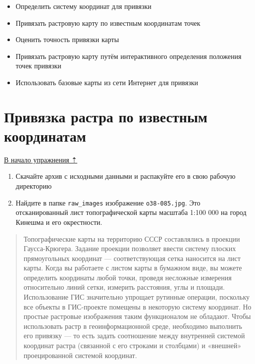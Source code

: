 \documentclass[
  12pt,
]{book}
\providecommand{\tightlist}{%
  \setlength{\itemsep}{0pt}\setlength{\parskip}{0pt}}
\begin{document}
\begin{itemize}
\tightlist
\item
  Определить систему координат для привязки
\item
  Привязать растровую карту по известным координатам точек
\item
  Оценить точность привязки карты
\item
  Привязать растровую карту путём интерактивного определения положения точек привязки
\item
  Использовать базовые карты из сети Интернет для привязки
\end{itemize}

\hypertarget{raster-reference-input}{%
\section{Привязка растра по известным координатам}\label{raster-reference-input}}

\protect\hyperlink{raster-reference}{В начало упражнения ⇡}

\begin{enumerate}
\def\labelenumi{\arabic{enumi}.}
\item
  Скачайте архив с исходными данными и распакуйте его в свою рабочую директорию
\item
  Найдите в папке \texttt{raw\_images} изображение \texttt{o38-085.jpg}. Это отсканированный лист топографической карты масштаба 1:100 000 на город Кинешма и его окрестности.
\end{enumerate}

\begin{quote}
Топографические карты на территорию СССР составлялись в проекции Гаусса-Крюгера. Задание проекции позволяет ввести систему плоских прямоугольных координат --- соответствующая сетка наносится на лист карты. Когда вы работаете с листом карты в бумажном виде, вы можете определить координаты любой точки, проведя несложные измерения относительно линий сетки, измерить расстояния, углы и площади. Использование ГИС значительно упрощает рутинные операции, поскольку все объекты в ГИС-проекте помещены в некоторую систему координат. Но простые растровые изображения таким функционалом не обладают.
Чтобы использовать растр в геоинформационной среде, необходимо выполнить его привязку --- то есть задать соотношение между внутренней системой координат растра (связанной с его строками и столбцами) и «внешней» проецированной системой координат.
\end{quote}
\end{document}
